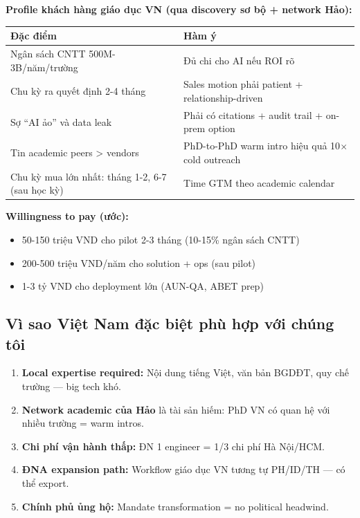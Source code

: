 \documentclass[11pt,a4paper]{article}
\begin{document}
\textbf{Profile khách hàng giáo dục VN (qua discovery sơ bộ + network Hảo):}

\begin{tabularx}{\linewidth}{@{}p{4cm} X@{}}
\toprule
\textbf{Đặc điểm} & \textbf{Hàm ý} \\
\midrule
Ngân sách CNTT 500M-3B/năm/trường & Đủ chi cho AI nếu ROI rõ \\
Chu kỳ ra quyết định 2-4 tháng & Sales motion phải patient + relationship-driven \\
Sợ ``AI ảo'' và data leak & Phải có citations + audit trail + on-prem option \\
Tin academic peers > vendors & PhD-to-PhD warm intro hiệu quả 10$\times$ cold outreach \\
Chu kỳ mua lớn nhất: tháng 1-2, 6-7 (sau học kỳ) & Time GTM theo academic calendar \\
\bottomrule
\end{tabularx}

\textbf{Willingness to pay (ước):}
\begin{itemize}
\item 50-150 triệu VND cho pilot 2-3 tháng (10-15\% ngân sách CNTT)
\item 200-500 triệu VND/năm cho solution + ops (sau pilot)
\item 1-3 tỷ VND cho deployment lớn (AUN-QA, ABET prep)
\end{itemize}

\subsection{Vì sao Việt Nam đặc biệt phù hợp với chúng tôi}

\begin{enumerate}
\item \textbf{Local expertise required:} Nội dung tiếng Việt, văn bản BGDĐT, quy chế trường --- big tech khó.
\item \textbf{Network academic của Hảo} là tài sản hiếm: PhD VN có quan hệ với nhiều trường = warm intros.
\item \textbf{Chi phí vận hành thấp:} ĐN 1 engineer = 1/3 chi phí Hà Nội/HCM.
\item \textbf{ĐNA expansion path:} Workflow giáo dục VN tương tự PH/ID/TH --- có thể export.
\item \textbf{Chính phủ ủng hộ:} Mandate transformation = no political headwind.
\end{enumerate}

\clearpage
\end{document}
